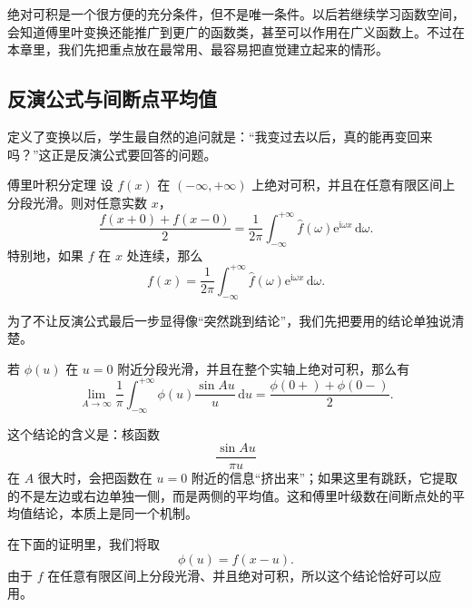 \begin{zhu}{}{}
绝对可积是一个很方便的充分条件，但不是唯一条件。以后若继续学习函数空间，会知道傅里叶变换还能推广到更广的函数类，甚至可以作用在广义函数上。不过在本章里，我们先把重点放在最常用、最容易把直觉建立起来的情形。
\end{zhu}

\subsection{反演公式与间断点平均值}

定义了变换以后，学生最自然的追问就是：``我变过去以后，真的能再变回来吗？''这正是反演公式要回答的问题。

\begin{dingli}{傅里叶积分定理}{}
设 $f(x)$ 在 $(-\infty,+\infty)$ 上绝对可积，并且在任意有限区间上分段光滑。则对任意实数 $x$，
\begin{equation}
    \frac{f(x+0)+f(x-0)}{2}
    =
    \frac{1}{2\pi}
    \int_{-\infty}^{+\infty}
    \hat{f}(\omega)\mathrm{e}^{\mathrm{i}\omega x}\,\mathrm{d}\omega.
\end{equation}
特别地，如果 $f$ 在 $x$ 处连续，那么
\begin{equation}
    f(x)
    =
    \frac{1}{2\pi}
    \int_{-\infty}^{+\infty}
    \hat{f}(\omega)\mathrm{e}^{\mathrm{i}\omega x}\,\mathrm{d}\omega.
\end{equation}
\end{dingli}

\begin{tishi}[证明最后一步会用到什么]
为了不让反演公式最后一步显得像``突然跳到结论''，我们先把要用的结论单独说清楚。

若 $\phi(u)$ 在 $u=0$ 附近分段光滑，并且在整个实轴上绝对可积，那么有
\begin{equation}
    \lim_{A\to\infty}
    \frac{1}{\pi}
    \int_{-\infty}^{+\infty}
    \phi(u)\frac{\sin Au}{u}\,\mathrm{d}u
    =
    \frac{\phi(0+)+\phi(0-)}{2}.
\end{equation}

这个结论的含义是：核函数
\[
    \frac{\sin Au}{\pi u}
\]
在 $A$ 很大时，会把函数在 $u=0$ 附近的信息``挤出来''；如果这里有跳跃，它提取的不是左边或右边单独一侧，而是两侧的平均值。这和傅里叶级数在间断点处的平均值结论，本质上是同一个机制。

在下面的证明里，我们将取
\[
    \phi(u)=f(x-u).
\]
由于 $f$ 在任意有限区间上分段光滑、并且绝对可积，所以这个结论恰好可以应用。
\end{tishi}

